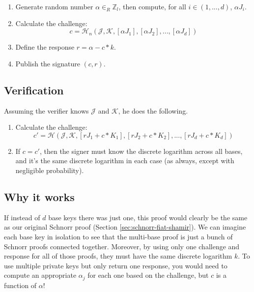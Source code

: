 \begin{enumerate}
	\item Generate random number $\alpha \in_R \mathbb{Z}_l$, then compute, for all $i \in (1,...,d)$, $\alpha J_i$.
	\item Calculate the challenge:\vspace{.155cm}
	\[c = \mathcal{H}_n(\mathcal{J},\mathcal{K},[\alpha J_1],[\alpha J_2],...,[\alpha J_d])\]
	\item Define the response $r = \alpha - c*k$.
	\item Publish the signature $(c, r)$.
\end{enumerate}


\subsection*{Verification}

Assuming the verifier knows $\mathcal{J}$ and $\mathcal{K}$, he does the following.

\begin{enumerate}
	\item Calculate the challenge:\vspace{.175cm}
	\[c' = \mathcal{H}(\mathcal{J},\mathcal{K},[r J_1 + c*K_1],[r J_2 + c*K_2],...,[r J_d + c*K_d])\]
	\item If $c = c'$, then the signer must know the discrete logarithm across all bases, and it's the same discrete logarithm in each case (as always, except with negligible probability).
\end{enumerate}


\subsection*{Why it works}

If instead of $d$ base keys there was just one, this proof would clearly be the same as our original Schnorr proof (Section \ref{sec:schnorr-fiat-shamir}). We can imagine each base key in isolation to see that the multi-base proof is just a bunch of Schnorr proofs connected together. Moreover, by using only one challenge and response for all of those proofs, they must have the same discrete logarithm $k$. To use multiple private keys but only return one response, you would need to compute an appropriate $\alpha_j$ for each one based on the challenge, but $c$ is a function of $\alpha$!




